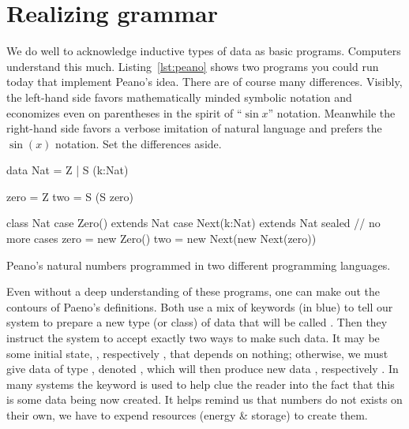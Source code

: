 \section{Realizing grammar}

We do well to acknowledge inductive types of data as basic programs. Computers
understand this much. Listing~\ref{lst:peano} shows two programs you could run
today that implement Peano's idea. There are of course many differences.
Visibly, the left-hand side favors mathematically minded symbolic notation and
economizes even on parentheses in the spirit of ``$\sin x$'' notation. Meanwhile
the right-hand side favors a verbose imitation of natural language and prefers
the $\sin(x)$ notation.  Set the differences aside.

\begin{lstfloat}
\begin{center}
\begin{minipage}{0.37\textwidth}
\begin{Fcode}[]
data Nat = Z 
    | S (k:Nat)

zero = Z
two = S (S zero)
\end{Fcode}
\end{minipage}
\hfill
\begin{minipage}{0.62\textwidth}
\begin{Pcode}[language=Sava]
class Nat
  case Zero() extends Nat
  case Next(k:Nat) extends Nat
sealed  // no more cases
zero = new Zero()
two = new Next(new Next(zero))
\end{Pcode}
\end{minipage}
\end{center}
\caption{Peano's natural numbers programmed in two different programming languages.}
\label{lst:peano}
\end{lstfloat}
    

Even without a deep understanding of these programs, one can make out the
contours of Paeno's definitions.  Both use a mix of keywords (in blue) to tell
our system to prepare a new type (or class) of data that will be called
.  Then they instruct the system to accept exactly two ways to make
such data. It may be some initial state, , respectively ,
that depends on nothing; otherwise, we must give data  of type
, denoted , which will then produce new data ,
respectively .  In many systems the keyword  is 
used to help clue the reader into the fact that this is some data being now 
created.  It helps remind us that numbers do not  exists on their own, 
we have to expend resources (energy \& storage) to create them. 

